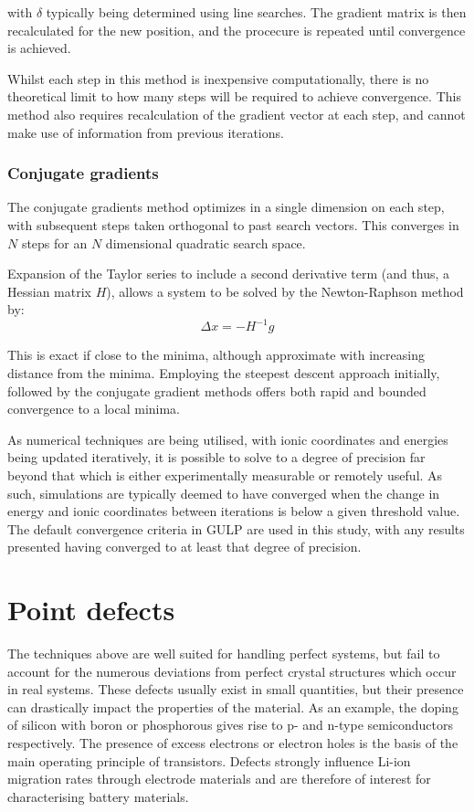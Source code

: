 with $\delta$ typically being determined using line searches.
The gradient matrix is then recalculated for the new position, and the procecure is repeated until convergence is achieved.

Whilst each step in this method is inexpensive computationally, there is no theoretical limit to how many steps will be required to achieve convergence.
This method also requires recalculation of the gradient vector at each step, and cannot make use of information from previous iterations.

\subsubsection{Conjugate gradients}
The conjugate gradients method optimizes in a single dimension on each step, with subsequent steps taken orthogonal to past search vectors.
This converges in $N$ steps for an $N$ dimensional quadratic search space.

Expansion of the Taylor series to include a second derivative term (and thus, a Hessian matrix $H$), allows a system to be solved by the Newton-Raphson method by:
$$
\Delta x = -H^{-1}g
$$

This is exact if close to the minima, although approximate with increasing distance from the minima.
Employing the steepest descent approach initially, followed by the conjugate gradient methods offers both rapid and bounded convergence to a local minima.


As numerical techniques are being utilised, with ionic coordinates and energies being updated iteratively, it is possible to solve to a degree of precision far beyond that which is either experimentally measurable or remotely useful.
As such, simulations are typically deemed to have converged when the change in energy and ionic coordinates between iterations is below a given threshold value.
The default convergence criteria in GULP are used in this study, with any results presented having converged to at least that degree of precision.

\section{Point defects}
The techniques above are well suited for handling perfect systems, but fail to account for the numerous deviations from perfect crystal structures which occur in real systems.
These defects usually exist in small quantities, but their presence can drastically impact the properties of the material.
As an example, the doping of silicon with boron or phosphorous gives rise to p- and n-type semiconductors respectively.
The presence of excess electrons or electron holes is the basis of the main operating principle of transistors.
Defects strongly influence Li-ion migration rates through electrode materials and are therefore of interest for characterising battery materials.

